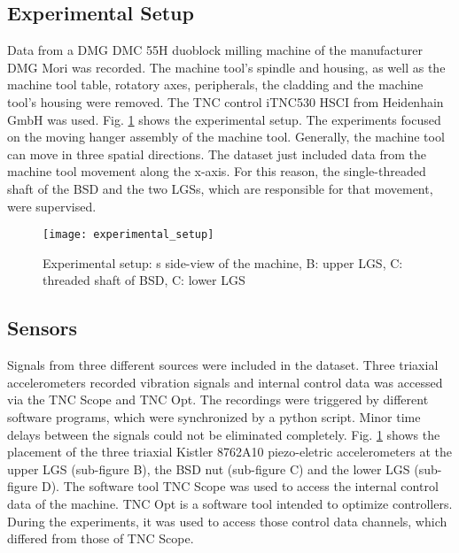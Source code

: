 \subsection{Experimental Setup}
Data from a DMG DMC 55H duoblock milling machine of the manufacturer DMG Mori was recorded. The machine tool’s spindle and housing, as well as the machine tool table, rotatory axes, peripherals, the cladding and the machine tool's housing were removed. The TNC control iTNC530 HSCI from Heidenhain GmbH was used. Fig. \ref{fig:experimental_setup} shows the experimental setup. The experiments focused on the moving hanger assembly of the machine tool. Generally, the machine tool can move in three spatial directions. The dataset just included data from the machine tool movement along the x-axis. For this reason, the single-threaded shaft of the BSD and the two LGSs, which are responsible for that movement, were supervised.

\begin{figure}[H]
  \centering
  \texttt{[image: experimental\_setup]}
  \caption {Experimental setup: s side-view of the machine, B: upper LGS, C: threaded shaft of BSD, C: lower LGS}
  \label{fig:experimental_setup}
\end{figure}

\subsection{Sensors}
Signals from three different sources were included in the dataset. Three triaxial accelerometers recorded vibration signals and internal control data was accessed via the TNC Scope and TNC Opt. The recordings were triggered by different software programs, which were synchronized by a python script. Minor time delays between the signals could not be eliminated completely. Fig. \ref{fig:experimental_setup} shows the placement of the three triaxial Kistler 8762A10 piezo-eletric accelerometers at the upper LGS (sub-figure B), the BSD nut (sub-figure C) and the lower LGS (sub-figure D). The software tool TNC Scope was used to access the internal control data of the machine. TNC Opt is a software tool intended to optimize controllers. During the experiments, it was used to access those control data channels, which differed from those of TNC Scope.

